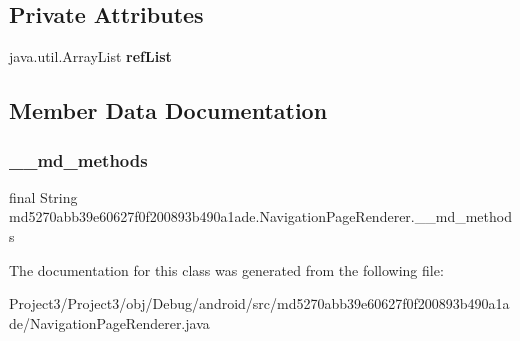 \subsection*{Private Attributes}
\begin{DoxyCompactItemize}
\item 
\mbox{\label{classmd5270abb39e60627f0f200893b490a1ade_1_1NavigationPageRenderer_ad437aec87e29f0fb2592513dc48257bd}} 
java.\+util.\+Array\+List {\bfseries ref\+List}
\end{DoxyCompactItemize}


\subsection{Member Data Documentation}
\mbox{\label{classmd5270abb39e60627f0f200893b490a1ade_1_1NavigationPageRenderer_af9b71b148669bb50bafafc240c856788}} 
\subsubsection{\texorpdfstring{\+\_\+\+\_\+md\+\_\+methods}{\_\_md\_methods}}
{\footnotesize\ttfamily final String md5270abb39e60627f0f200893b490a1ade.\+Navigation\+Page\+Renderer.\+\_\+\+\_\+md\+\_\+methods\hspace{0.3cm}{\ttfamily [static]}}



The documentation for this class was generated from the following file\+:\begin{DoxyCompactItemize}
\item 
Project3/\+Project3/obj/\+Debug/android/src/md5270abb39e60627f0f200893b490a1ade/Navigation\+Page\+Renderer.\+java\end{DoxyCompactItemize}
